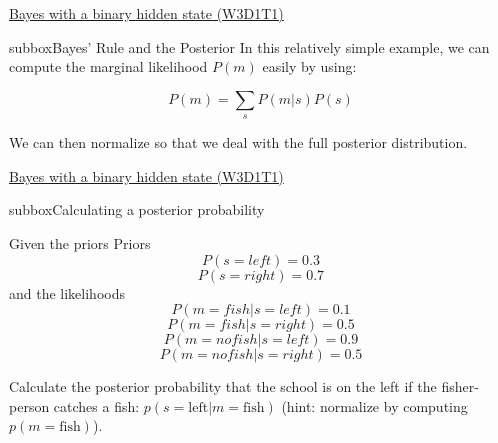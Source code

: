 \begin{textbox}{\href{https://compneuro.neuromatch.io/tutorials/W3D1_BayesianDecisions/student/W3D1_Tutorial1.html}{Bayes with a binary hidden state (W3D1T1)} }
\begin{subbox}{subbox}{Bayes' Rule and the Posterior}
In this relatively simple example, we can compute the marginal likelihood $P(m)$ easily by using:

\begin{equation}
P(m) = \sum_s P(m | s) P(s)
\end{equation}

We can then normalize so that we deal with the full posterior distribution.
 
\end{subbox}

\end{textbox}


\begin{textbox}{\href{https://compneuro.neuromatch.io/tutorials/W3D1_BayesianDecisions/student/W3D1_Tutorial1.html}{Bayes with a binary hidden state (W3D1T1)} }
\begin{subbox}{subbox}{Calculating a posterior probability
}
\scriptsize

Given the priors
Priors
$$P(s = left) = 0.3$$
$$P(s = right) = 0.7$$
and the likelihoods
$$P(m = fish | s = left) = 0.1$$
$$P(m = fish | s = right) = 0.5$$
$$P(m = no fish | s = left) = 0.9$$
$$P(m = no fish | s = right) = 0.5$$

Calculate the posterior probability that the school is on the left if the fisher-person catches a fish: $p(s = \textrm{left} | m = \textrm{fish})$ (hint: normalize by computing $p(m = \textrm{fish})$).


\end{subbox}
\end{textbox}

